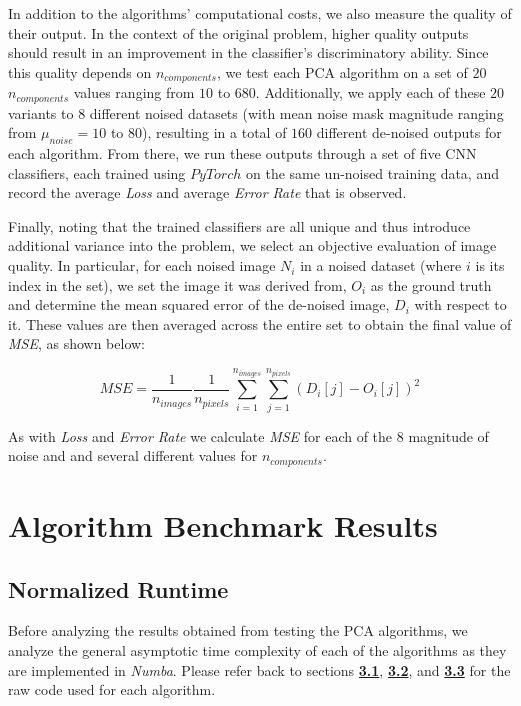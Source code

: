 \documentclass[12pt]{article}
\begin{document}
    In addition to the algorithms' computational costs, we also measure the quality of their output. In the context of the original problem, higher quality outputs should result in an improvement in the classifier's discriminatory ability. Since this quality depends on $n_{components}$, we test each PCA algorithm on a set of $20$ $n_{components}$ values ranging from $10$ to $680$. Additionally, we apply each of these $20$ variants to $8$ different noised datasets (with mean noise mask magnitude ranging from $\mu_{noise} = 10$ to $80$), resulting in a total of $160$ different de-noised outputs for each algorithm. From there, we run these outputs through a set of five CNN classifiers, each trained using $PyTorch$ on the same un-noised training data, and record the average \textit{Loss} and average \textit{Error Rate} that is observed. 
    
    Finally, noting that the trained classifiers are all unique and thus introduce additional variance into the problem, we select an objective evaluation of image quality. In particular, for each noised image $N_i$ in a noised dataset (where $i$ is its index in the set), we set the image it was derived from, $O_i$ as the ground truth and determine the mean squared error of the de-noised image, $D_i$ with respect to it. These values are then averaged across the entire set to obtain the final value of \textit{MSE}, as shown below:
    
    $$ \textit{MSE} = \frac{1}{n_{images}}\frac{1}{n_{pixels}}\sum_{i=1}^{n_{images}}\sum_{j=1}^{n_{pixels}}(D_i[j] - O_i[j])^2$$
    
    As with \textit{Loss} and \textit{Error Rate} we calculate \textit{MSE} for each of the $8$ magnitude of noise and and several different values for $n_{components}$.
   

\section{Algorithm Benchmark Results}\label{5}

\subsection{Normalized Runtime}\label{5.1}

Before analyzing the results obtained from testing the PCA algorithms, we analyze the general asymptotic time complexity of each of the algorithms as they are implemented in \textit{Numba}. Please refer back to sections \textbf{\hyperref[3.1]{3.1}}, \textbf{\hyperref[3.2]{3.2}}, and \textbf{\hyperref[3.3]{3.3}} for the raw code used for each algorithm.
\end{document}
